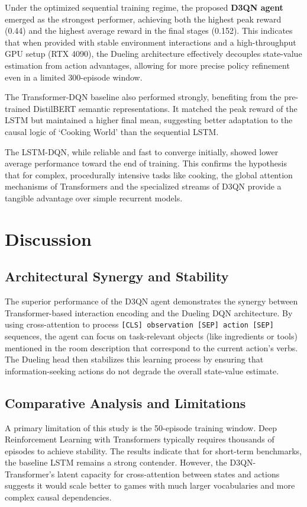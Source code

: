 \documentclass[11pt,a4paper]{article}
\begin{document}
Under the optimized sequential training regime, the proposed \textbf{D3QN agent} emerged as the strongest performer, achieving both the highest peak reward (0.44) and the highest average reward in the final stages (0.152). This indicates that when provided with stable environment interactions and a high-throughput GPU setup (RTX 4090), the Dueling architecture effectively decouples state-value estimation from action advantages, allowing for more precise policy refinement even in a limited 300-episode window.

The Transformer-DQN baseline also performed strongly, benefiting from the pre-trained DistilBERT semantic representations. It matched the peak reward of the LSTM but maintained a higher final mean, suggesting better adaptation to the causal logic of `Cooking World' than the sequential LSTM.

The LSTM-DQN, while reliable and fast to converge initially, showed lower average performance toward the end of training. This confirms the hypothesis that for complex, procedurally intensive tasks like cooking, the global attention mechanisms of Transformers and the specialized streams of D3QN provide a tangible advantage over simple recurrent models.

\section{Discussion}

\subsection{Architectural Synergy and Stability}
The superior performance of the D3QN agent demonstrates the synergy between Transformer-based interaction encoding and the Dueling DQN architecture. By using cross-attention to process \texttt{[CLS] observation [SEP] action [SEP]} sequences, the agent can focus on task-relevant objects (like ingredients or tools) mentioned in the room description that correspond to the current action's verbs. The Dueling head then stabilizes this learning process by ensuring that information-seeking actions do not degrade the overall state-value estimate.

\subsection{Comparative Analysis and Limitations}
A primary limitation of this study is the 50-episode training window. Deep Reinforcement Learning with Transformers typically requires thousands of episodes to achieve stability. The results indicate that for short-term benchmarks, the baseline LSTM remains a strong contender. However, the D3QN-Transformer's latent capacity for cross-attention between states and actions suggests it would scale better to games with much larger vocabularies and more complex causal dependencies.
\end{document}
